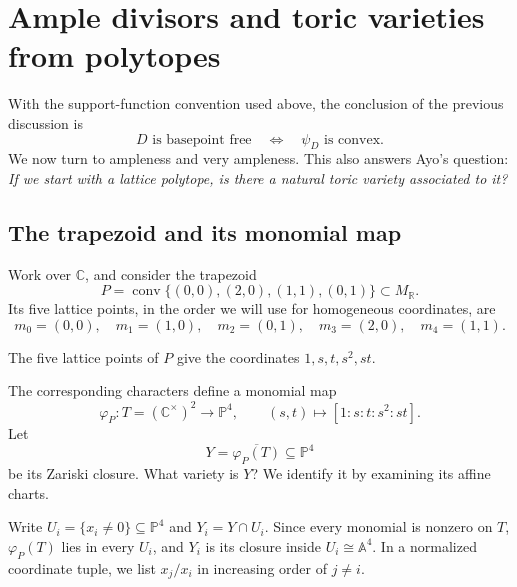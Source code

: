 \documentclass[11pt]{article}
\theoremstyle{definition}
\theoremstyle{remark}
\newcommand{\bA}{\mathbb{A}}
\newcommand{\bP}{\mathbb{P}}
\newcommand{\bR}{\mathbb{R}}
\newcommand{\vf}{\varphi}
\newcommand{\x}{\times}
\begin{document}
\section{Ample divisors and toric varieties from polytopes}

With the support-function convention used above, the conclusion of
the previous discussion is
\[
    \boxed{D\text{ is basepoint free}
    \quad\Longleftrightarrow\quad \psi_D\text{ is convex}.}
\]
We now turn to ampleness and very ampleness. This also answers Ayo's
question: \emph{If we start with a lattice polytope, is there a natural
toric variety associated to it?}

\subsection{The trapezoid and its monomial map}

Work over \(\mathbb C\), and consider the trapezoid
\[
    P=\operatorname{conv}\{(0,0),(2,0),(1,1),(0,1)\}
      \subset M_\bR.
\]
Its five lattice points, in the order we will use for homogeneous
coordinates, are
\[
    m_0=(0,0),\quad m_1=(1,0),\quad m_2=(0,1),\quad
    m_3=(2,0),\quad m_4=(1,1).
\]

\Needspace{5cm}
\begin{center}

{\small The five lattice points of \(P\) give the coordinates
\(1,s,t,s^2,st\).}
\end{center}

The corresponding characters define a monomial map
\[
    \vf_P:T=(\mathbb C^\times)^2\longrightarrow\bP^4,
    \qquad(s,t)\longmapsto[1:s:t:s^2:st].
\]
Let
\[
    Y=\overline{\vf_P(T)}\subseteq\bP^4
\]
be its Zariski closure. What variety is \(Y\)? We identify it by
examining its affine charts.

Write \(U_i=\{x_i\ne0\}\subseteq\bP^4\) and
\(Y_i=Y\cap U_i\). Since every monomial is nonzero on \(T\),
\(\vf_P(T)\) lies in every \(U_i\), and \(Y_i\) is its closure
inside \(U_i\cong\bA^4\). In a normalized coordinate tuple, we list
\(x_j/x_i\) in increasing order of \(j\ne i\).
\end{document}
